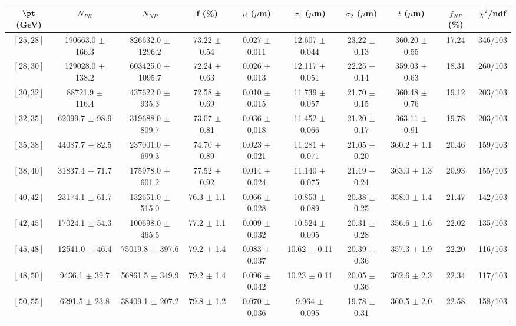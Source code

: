 \begin{tabular}{c||c|c|c|c|c|c|c||c|c}
$\pt$ (GeV) & $N_{PR}$ & $N_{NP}$ & f (\%) & $\mu$ ($\mu$m) & $\sigma_1$ ($\mu$m) & $\sigma_2$ ($\mu$m)  & $t$ ($\mu$m) & $f_{NP}$ (\%) & $\chi^2$/ndf \\
\hline
$[25, 28]$ & 190663.0 $\pm$ 166.3 & 826632.0 $\pm$ 1296.2 & 73.22 $\pm$ 0.54 & 0.027 $\pm$ 0.011 & 12.607 $\pm$ 0.044 & 23.22 $\pm$ 0.13 & 360.20 $\pm$ 0.55 & 17.24 & 346/103\\
$[28, 30]$ & 129028.0 $\pm$ 138.2 & 603425.0 $\pm$ 1095.7 & 72.24 $\pm$ 0.63 & 0.026 $\pm$ 0.013 & 12.117 $\pm$ 0.051 & 22.25 $\pm$ 0.14 & 359.03 $\pm$ 0.63 & 18.31 & 260/103\\
$[30, 32]$ & 88721.9 $\pm$ 116.4 & 437622.0 $\pm$ 935.3 & 72.58 $\pm$ 0.69 & 0.010 $\pm$ 0.015 & 11.739 $\pm$ 0.057 & 21.70 $\pm$ 0.15 & 360.48 $\pm$ 0.76 & 19.12 & 203/103\\
$[32, 35]$ & 62099.7 $\pm$ 98.9 & 319688.0 $\pm$ 809.7 & 73.07 $\pm$ 0.81 & 0.036 $\pm$ 0.018 & 11.452 $\pm$ 0.066 & 21.20 $\pm$ 0.17 & 363.11 $\pm$ 0.91 & 19.78 & 203/103\\
$[35, 38]$ & 44087.7 $\pm$ 82.5 & 237001.0 $\pm$ 699.3 & 74.70 $\pm$ 0.89 & 0.023 $\pm$ 0.021 & 11.281 $\pm$ 0.071 & 21.05 $\pm$ 0.20 & 360.2 $\pm$ 1.1 & 20.46 & 159/103\\
$[38, 40]$ & 31837.4 $\pm$ 71.7 & 175978.0 $\pm$ 601.2 & 77.52 $\pm$ 0.92 & 0.014 $\pm$ 0.024 & 11.140 $\pm$ 0.075 & 21.19 $\pm$ 0.24 & 363.0 $\pm$ 1.3 & 20.93 & 155/103\\
$[40, 42]$ & 23174.1 $\pm$ 61.7 & 132651.0 $\pm$ 515.0 & 76.3 $\pm$ 1.1 & 0.066 $\pm$ 0.028 & 10.853 $\pm$ 0.089 & 20.38 $\pm$ 0.25 & 358.0 $\pm$ 1.4 & 21.47 & 142/103\\
$[42, 45]$ & 17024.1 $\pm$ 54.3 & 100698.0 $\pm$ 465.5 & 77.2 $\pm$ 1.1 & 0.009 $\pm$ 0.032 & 10.524 $\pm$ 0.095 & 20.31 $\pm$ 0.28 & 356.6 $\pm$ 1.6 & 22.02 & 135/103\\
$[45, 48]$ & 12541.0 $\pm$ 46.4 & 75019.8 $\pm$ 397.6 & 79.2 $\pm$ 1.4 & 0.083 $\pm$ 0.037 & 10.62 $\pm$ 0.11 & 20.39 $\pm$ 0.36 & 357.3 $\pm$ 1.9 & 22.20 & 116/103\\
$[48, 50]$ & 9436.1 $\pm$ 39.7 & 56861.5 $\pm$ 349.9 & 79.2 $\pm$ 1.4 & 0.096 $\pm$ 0.042 & 10.23 $\pm$ 0.11 & 20.05 $\pm$ 0.36 & 362.6 $\pm$ 2.3 & 22.34 & 117/103\\
$[50, 55]$ & 6291.5 $\pm$ 23.8 & 38409.1 $\pm$ 207.2 & 79.8 $\pm$ 1.2 & 0.070 $\pm$ 0.036 & 9.964 $\pm$ 0.095 & 19.78 $\pm$ 0.31 & 360.5 $\pm$ 2.0 & 22.58 & 158/103\\

\end{tabular}
